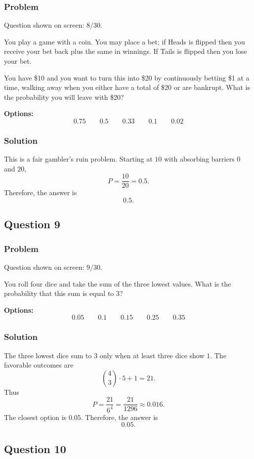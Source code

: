 \documentclass[12pt]{article}
\begin{document}
\subsubsection{Problem}
Question shown on screen: \(8/30\).

You play a game with a coin. You may place a bet; if Heads is flipped then you receive your bet back plus the same in winnings. If Tails is flipped then you lose your bet.

You have \$10 and you want to turn this into \$20 by continuously betting \$1 at a time, walking away when you either have a total of \$20 or are bankrupt. What is the probability you will leave with \$20?

\noindent\textbf{Options:}
\[
\boxed{0.75}
\qquad
\boxed{0.5}
\qquad
\boxed{0.33}
\qquad
\boxed{0.1}
\qquad
\boxed{0.02}
\]

\subsubsection{Solution}
This is a fair gambler's ruin problem. Starting at \(10\) with absorbing barriers \(0\) and \(20\),
\[
P=\frac{10}{20}=0.5.
\]
Therefore, the answer is
\[
\boxed{0.5}.
\]

\subsection{Question 9}
\subsubsection{Problem}
Question shown on screen: \(9/30\).

You roll four dice and take the sum of the three lowest values. What is the probability that this sum is equal to 3?

\noindent\textbf{Options:}
\[
\boxed{0.05}
\qquad
\boxed{0.1}
\qquad
\boxed{0.15}
\qquad
\boxed{0.25}
\qquad
\boxed{0.35}
\]

\subsubsection{Solution}
The three lowest dice sum to \(3\) only when at least three dice show \(1\). The favorable outcomes are
\[
\binom{4}{3}\cdot 5+1=21.
\]
Thus
\[
P=\frac{21}{6^4}=\frac{21}{1296}\approx 0.016.
\]
The closest option is \(0.05\). Therefore, the answer is
\[
\boxed{0.05}.
\]

\subsection{Question 10}
\end{document}
